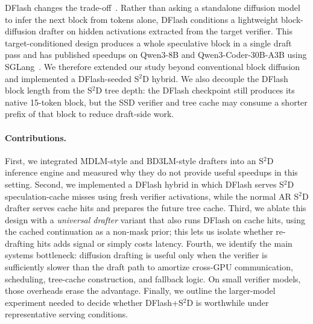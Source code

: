 DFlash changes the trade-off~\cite{chen2026dflash}. Rather than asking a
standalone diffusion model to infer the next block from tokens alone, DFlash
conditions a lightweight block-diffusion drafter on hidden activations
extracted from the target verifier. This target-conditioned design produces a
whole speculative block in a single draft pass and has published speedups on
Qwen3-8B and Qwen3-Coder-30B-A3B using SGLang~\cite{zheng2024sglang}. We
therefore extended our study beyond conventional block diffusion and
implemented a DFlash-seeded S$^2$D hybrid. We also decouple the DFlash block
length from the S$^2$D tree depth: the DFlash checkpoint still produces its
native 15-token block, but the SSD verifier and tree cache may consume a
shorter prefix of that block to reduce draft-side work.

\paragraph{Contributions.}
First, we integrated MDLM-style and BD3LM-style drafters into an S$^2$D
inference engine and measured why they do not provide useful speedups in this
setting. Second, we implemented a DFlash hybrid in which DFlash serves
S$^2$D speculation-cache misses using fresh verifier activations, while the
normal AR S$^2$D drafter serves cache hits and prepares the future tree cache.
Third, we ablate this design with a \emph{universal drafter} variant that
also runs DFlash on cache hits, using the cached continuation as a non-mask
prior; this lets us isolate whether re-drafting hits adds signal or simply
costs latency. Fourth, we identify the main systems bottleneck: diffusion
drafting is useful only when the verifier is sufficiently slower than the
draft path to amortize cross-GPU communication, scheduling, tree-cache
construction, and fallback logic. On small verifier models, those overheads
erase the advantage. Finally, we outline the larger-model experiment needed
to decide whether DFlash+S$^2$D is worthwhile under representative serving
conditions.
